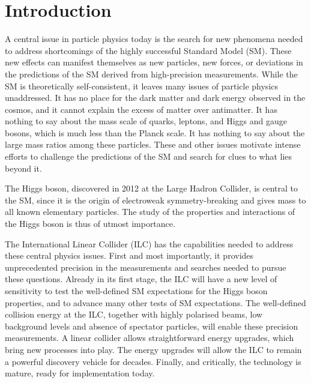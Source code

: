 \documentclass[%
 reprint,
 amsmath,amssymb,
 aps,
]{revtex4-1}
\newcommand{\todo}[1]{\textcolor{red}{{#1}}}
\begin{document}
\pagebreak

\pagestyle{plain}
\setcounter{page}{1}

\twocolumngrid



\vspace{-.4cm}

\section{\label{sec:intro}Introduction}

\vspace{-.3cm}


A central issue in particle physics today is the search for new
 phenomena needed to address shortcomings of the 
highly successful Standard Model (SM).  These new effects can manifest
themselves as new particles, new forces, 
 or deviations in the predictions of the SM derived from
 high-precision measurements. While the SM is theoretically
 self-consistent,
it leaves many issues of particle physics unaddressed. 
It has no place for the dark matter and dark energy observed in the
cosmos,
and it cannot explain the excess of matter over antimatter.   It has
nothing to say about the mass scale of quarks, leptons, and Higgs and gauge 
bosons, which is much less than the Planck scale.   It has nothing 
to say about the large mass ratios among these particles.   These and 
other issues motivate intense efforts to challenge the predictions of
the SM and search for clues to what lies beyond it.
 
The Higgs boson,
 discovered in 2012 at the Large Hadron Collider, is
central to the SM,  since it is the  origin of 
 electroweak symmetry-breaking and gives mass to all 
known elementary particles.   The study of the properties and
interactions of the Higgs boson is thus of utmost importance.

The International Linear Collider (ILC) has the capabilities needed
to address these central physics issues.  First and most importantly, it provides
unprecedented precision in the measurements and searches needed to
pursue these questions.  Already in its first stage, the 
ILC will have a new level of sensitivity to test the well-defined SM
expectations for the Higgs boson properties, and to advance many other 
tests of SM expectations.  
The well-defined collision energy at the ILC, together with highly polarised beams, low background levels and absence of spectator particles, will enable these precision measurements.
    A linear collider allows straightforward energy
upgrades, which bring new processes into play. 
The energy upgrades will allow the ILC to remain a powerful 
discovery vehicle for decades. 
Finally, and critically, the technology is mature, 
ready for implementation today.
\end{document}
